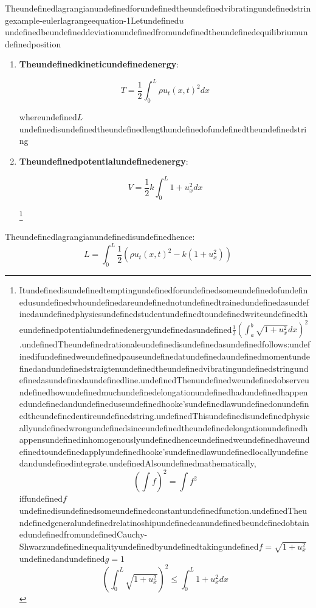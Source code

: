 \begin{mystthmexample}{Theundefinedlagrangianundefinedforundefinedtheundefinedvibratingundefinedstring}{example-eulerlagrangeequation-1}Letundefined$u$undefinedbeundefineddeviationundefinedfromundefinedtheundefinedequilibriumundefinedposition

\begin{enumerate}
\item \textbf{Theundefinedkineticundefinedenergy}:

\begin{equation}
T=\frac{1}{2}\int_{0}^L \rho u_t(x,t)^2dx
\end{equation}


whereundefined$L$undefinedisundefinedtheundefinedlengthundefinedofundefinedtheundefinedstring


\item \textbf{Theundefinedpotentialundefinedenergy}:

\begin{equation}
V=\frac{1}{2}k\int_{0}^L {1+u_x^2} dx
\end{equation}

\footnote{Itundefinedisundefinedtemptingundefinedforundefinedsomeundefinedofundefinedusundefinedwhoundefinedareundefinednotundefinedtrainedundefinedasundefinedaundefinedphysicsundefinedstudentundefinedtoundefinedwriteundefinedtheundefinedpotentialundefinedenergyundefinedasundefined$\frac12 \left(\int_a^b \sqrt{1+u_x^2}dx\right)^2$.undefinedTheundefinedrationaleundefinedisundefinedasundefinedfollows:undefinedifundefinedweundefinedpauseundefinedatundefinedaundefinedmomentundefinedandundefinedstraigtenundefinedtheundefinedvibratingundefinedstringundefinedasundefinedaundefinedline.undefinedThenundefinedweundefinedobserveundefinedhowundefinedmuchundefinedelongationundefinedhadundefinedhappenedundefinedandundefineduseundefinedhooke'sundefinedlawundefinedonundefinedtheundefinedentireundefinedstring.undefinedThisundefinedisundefinedphysicallyundefinedwrongundefinedsinceundefinedtheundefinedelongationundefinedhappensundefinedinhomogenouslyundefinedhenceundefinedweundefinedhaveundefinedtoundefinedapplyundefinedhooke'sundefinedlawundefinedlocallyundefinedandundefinedintegrate.undefinedAlsoundefinedmathematically,
\begin{equation}
\left(\int f\right)^2 =\int f^2
\end{equation}
iffundefined$f$undefinedisundefinedsomeundefinedconstantundefinedfunction.undefinedTheundefinedgeneralundefinedrelatinoshipundefinedcanundefinedbeundefinedobtainedundefinedfromundefinedCauchy-Shwarzundefinedinequalityundefinedbyundefinedtakingundefined$f=\sqrt{1+u_x^2}$undefinedandundefined$g=1$
\begin{equation}
\left(\int_0^L \sqrt{1+u_x^2}\right)^2 \leq \int_0^L 1+u_x^2 dx
\end{equation}}
\end{enumerate}

Theundefinedlagrangianundefinedisundefinedhence:
\begin{equation}
L=\int_0^L \frac{1}{2} \left(\rho u_t(x,t)^2 - k(1+u_x^2)\right)
\end{equation}

\end{mystthmexample}
